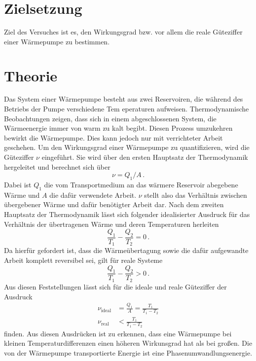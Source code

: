 \section{Zielsetzung}
Ziel des Versuches ist es, den Wirkungsgrad bzw. vor allem  
die reale Güteziffer einer Wärmepumpe zu bestimmen.
\section{Theorie}
\label{sec:Theorie}

Das System einer Wärmepumpe besteht aus zwei Reservoiren, die 
während des Betriebs der Pumpe verschiedene Tem  eperaturen aufweisen.
Thermodynamische Beobachtungen zeigen, dass sich in einem abgeschlossenen
System, die Wärmeenergie immer von warm zu kalt begibt. Diesen
Prozess umzukehren bewirkt die Wärmepumpe. Dies kann jedoch nur mit 
verrichteter Arbeit geschehen. Um den Wirkungsgrad einer Wärmepumpe 
zu quantifizieren, wird die Güteziffer $\nu$ eingeführt. Sie wird 
über den ersten Hauptsatz der Thermodynamik hergeleitet und berechnet 
sich über 
\begin{equation*}
    \nu=Q_1/A\,.
\end{equation*}
Dabei ist $Q_1$ die vom Transportmedium an das wärmere Reservoir abegebene
Wärme und $A$ die dafür verwendete Arbeit. $\nu$ stellt also das Verhältnis 
zwischen übergebener Wärme und dafür benötigter Arbeit dar. Nach dem zweiten
Hauptsatz der Thermodynamik lässt sich folgender idealisierter Ausdruck für 
das Verhältnis der übertragenen Wärme und deren Temperaturen herleiten 
\begin{equation*}
    \frac{Q_1}{T_1}-\frac{Q_2}{T_2}=0\,.
\end{equation*}
Da hierfür gefordert ist, dass die Wärmeübertagung sowie die dafür aufgewandte
Arbeit komplett reversibel sei, gilt für reale Systeme 
\begin{equation*}
    \frac{Q_1}{T_1}-\frac{Q_2}{T_2}>0\,.
\end{equation*}
Aus diesen Feststellungen lässt sich für die ideale und reale Güteziffer der 
Ausdruck 
\begin{align}
    \nu_\text{ideal}&=\frac{Q_1}{A}=\frac{T_1}{T_1-T_2} \label{eq:Gueteideal}\\
    \nu_\text{real}&<\frac{T_1}{T_1-T_2}\nonumber
\end{align}
finden. Aus diesen Ausdrücken ist zu erkennen, dass eine Wärmepumpe bei kleinen 
Temperaturdifferenzen einen höheren Wirkunsgrad hat als bei großen.
Die von der Wärmepumpe transportierte Energie ist eine Phasenumwandlungsenergie. 
